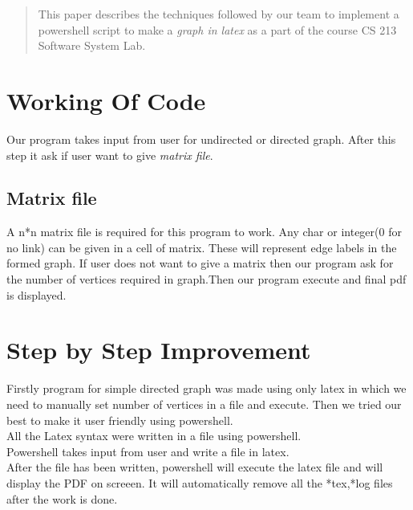 \documentclass[12pt]{article}
\begin{document}
\maketitle

\begin{abstract} %
This paper describes the techniques followed by our team to implement a powershell script to make a \textit{graph in latex} as a part of the course CS 213 Software System Lab.
\end{abstract}

\section{Working Of Code}
Our program takes input from user for undirected or directed graph. After this step it ask if user want to give \textit{matrix file}.   
\subsection{Matrix file}
A n*n matrix file is required for this program to work. Any char or integer(0 for no link) can be given in a cell of matrix. These will represent edge labels in the formed graph.
If user does not want to give a matrix then our program ask for the number of vertices required in graph.Then our program execute and final pdf is displayed.
\section{Step by Step Improvement}
Firstly program for simple directed graph was made using only latex in which we need to manually set number of vertices in a file and execute.
Then we tried our best to make it user friendly using powershell.\\
All the Latex syntax were written in a file using powershell.\\
Powershell takes input from user and write a file in latex.\\
After the file has been written, powershell will execute the latex file and will display the PDF on screeen.
It will automatically remove all the *tex,*log files after the work is done.




%
%
\end{document}
